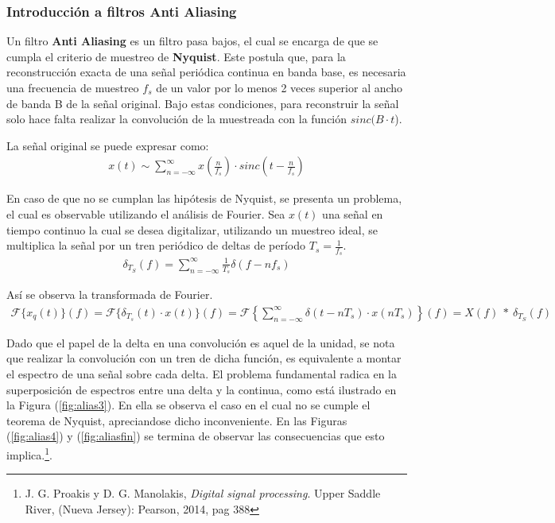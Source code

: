 


\subsubsection{Introducción a filtros Anti Aliasing}
Un filtro \textbf{Anti Aliasing} es un filtro pasa bajos, el cual se encarga de que se cumpla el criterio de muestreo de \textbf{Nyquist}. Este postula que, para la reconstrucción exacta de una señal periódica continua en banda base, es necesaria una frecuencia de muestreo $f_s$ de un valor por lo menos 2 veces superior al ancho de banda B de la señal original. Bajo estas condiciones, para reconstruir la señal solo hace falta realizar la convolución de la muestreada con la función $sinc(B\cdot t$).

La señal original se puede expresar como:
\begin{align}
	x\left( t \right) \sim \sum_{n=-\infty}^{\infty} x\left( \frac{n}{f_s} \right) \cdot sinc \left( t-\frac{n}{f_s} \right)
\end{align}

En caso de que no se cumplan las hipótesis de Nyquist, se presenta un problema, el cual es observable utilizando el análisis de Fourier. Sea $x(t)$ una señal en tiempo continuo la cual se desea digitalizar, utilizando un muestreo ideal, se multiplica la señal por un tren periódico de deltas de período $T_s = \frac{1}{f_s}$.
\begin{align}
\delta_{T_S}(f)= \sum_{n=-\infty}^{\infty} \frac{1}{T_s} \delta(f-nf_s)
\end{align}

Así se observa la transformada de Fourier.
\begin{align}
	\mathcal{F} \{x_q(t) \} (f) =\mathcal{F} \{ \delta_{T_s} (t) \cdot x(t) \} (f)=\mathcal{F} \left\lbrace \sum_{n=-\infty}^{\infty} \delta(t-nT_s) \cdot x(nT_s)\right\rbrace (f)= X(f)\  *  \ \delta_{T_S}(f)
\end{align}

Dado que el papel de la delta en una convolución es aquel de la unidad, se nota que realizar la convolución con un tren de dicha función, es equivalente a montar el espectro de una señal sobre cada delta. El problema fundamental radica en la superposición de espectros entre una delta y la continua, como está ilustrado en la Figura (\ref{fig:alias3}). En ella se observa el caso en el cual no se cumple el teorema de Nyquist, apreciandose dicho inconveniente. En las Figuras (\ref{fig:alias4}) y (\ref{fig:aliasfin}) se termina de observar las consecuencias que esto implica.\footnote{J. G. Proakis y D. G. Manolakis, \textit{Digital signal processing}. Upper Saddle River, (Nueva Jersey): Pearson, 2014, pag 388}.

